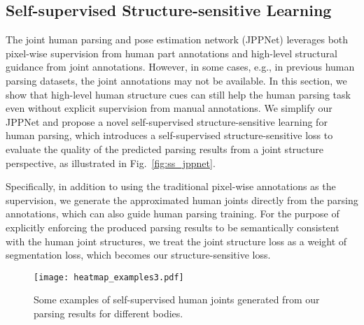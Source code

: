 \documentclass[10pt,journal,compsoc]{IEEEtran}
\begin{document}
\subsection{Self-supervised Structure-sensitive Learning}
The joint human parsing and pose estimation network (JPPNet) leverages both pixel-wise supervision from human part annotations and high-level structural guidance from joint annotations. However, in some cases, e.g., in previous human parsing datasets, the joint annotations may not be available. In this section, we show that high-level human structure cues can still help the human parsing task even without explicit supervision from manual annotations. We simplify our JPPNet and propose a novel self-supervised structure-sensitive learning for human parsing, which introduces a self-supervised structure-sensitive loss to evaluate the quality of the predicted parsing results from a joint structure perspective, as illustrated in Fig.~\ref{fig:ss_jppnet}.

Specifically, in addition to using the traditional pixel-wise annotations as the supervision, we generate the approximated human joints directly from the parsing annotations, which can also guide human parsing training. For the purpose of explicitly enforcing the produced parsing results to be semantically consistent with the human joint structures, we treat the joint structure loss as a weight of segmentation loss, which becomes our structure-sensitive loss.



\begin{figure}[t]
\centering
\texttt{[image: heatmap\_examples3.pdf]}
\vspace{-4mm}
\caption{Some examples of self-supervised human joints generated from our parsing results for different bodies.}
\vspace{-2mm}
\label{fig:heatmap_example}
\end{figure}
\end{document}
